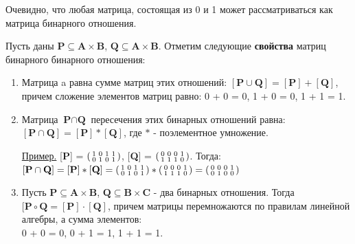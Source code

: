 \documentclass[12pt, a4paper, oneside]{article}
\theoremstyle{plain} %
\theoremstyle{definition}
\newcommand{\indef}[1]{\textbf{ \color{dark_red} #1}}
\begin{document}
Очевидно, что любая матрица, состоящая из 0 и 1 может рассматриваться как матрица бинарного отношения. \par 

Пусть даны $\textbf{P} \subseteq \textbf{A} \times \textbf{B}$, $\textbf{Q} \subseteq \textbf{A} \times \textbf{B}$. Отметим следующие \indef{свойства} матриц бинарного бинарного отношения:

\begin{enumerate}
    
    \item Матрица a равна сумме матриц этих отношений: $[\textbf{P} \cup \textbf{Q}] = [\textbf{P}] + [\textbf{Q}]$, причем сложение элементов матриц равно: 0 + 0 = 0, 1 + 0 = 0, 1 + 1 = 1.
    
    \item Матрица $\textbf{P} \cap \textbf{Q}$ пересечения этих бинарных отношений равна: $[\textbf{P} \cap \textbf{Q}] = [\textbf{P}] * [\textbf{Q}]$, где $*$ - поэлементное умножение.
    
    
    \underline{Пример.} [\textbf{P}] = $\begin{psmallmatrix}
    1 & 0 & 1 & 1\\
    0 & 1 & 0 & 1
    \end{psmallmatrix}$, [\textbf{Q}] = $\begin{psmallmatrix}
    0 & 0 & 0 & 1\\ 
    1 & 1 & 1 & 0
    \end{psmallmatrix}$. Тогда: $[\textbf{P} \cap \textbf{Q}] = [\textbf{P}] * [\textbf{Q}] = \begin{psmallmatrix}
    1 & 0 & 1 & 1\\
    0 & 1 & 0 & 1
    \end{psmallmatrix} * \begin{psmallmatrix}
    0 & 0 & 0 & 1\\ 
    1 & 1 & 1 & 0
    \end{psmallmatrix} = \begin{psmallmatrix}
    0 & 0 & 0 & 1\\
    0 & 1 & 0 & 0
    \end{psmallmatrix}$  
    
    \item Пусть $\textbf{P} \subseteq \textbf{A} \times \textbf{B}$, $\textbf{Q} \subseteq \textbf{B} \times \textbf{C}$ - два бинарных отношения. Тогда $[\textbf{P} \circ \textbf{Q} = [\textbf{P}] \cdot [\textbf{Q}]$, причем матрицы перемножаются по правилам линейной алгебры, а сумма элементов:\\ 0 + 0 = 0, 0 + 1 = 1, 1 + 1 = 1.
    

\end{enumerate}
\end{document}
